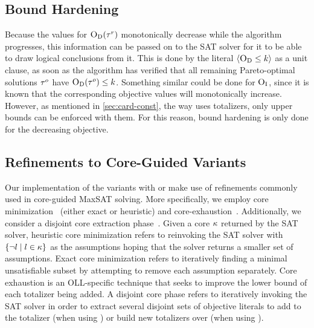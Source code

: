 \subsection{Bound Hardening}

Because the values for $\textsc{O}_{\text{D}}(\tau^r)$ monotonically decrease while the algorithm progresses, this information can be passed on to the SAT solver for it to be able to draw logical conclusions from it.
This is done by the literal $\langle \textsc{O}_{\text{D}} \leq k \rangle$ as a unit clause, as soon as the algorithm has verified that all remaining Pareto-optimal solutions $\tau^o$ have $\textsc{O}_{\text{D}}(\tau^o)\le k$.
Something similar could be done for $\textsc{O}_{\text{I}}$, since it is known that the corresponding objective values will monotonically increase.
However, as mentioned in \cref{sec:card-const}, the way \algname{} uses totalizers, only upper bounds can be enforced with them.
For this reason, bound hardening is only done for the decreasing objective.

\subsection{Refinements to Core-Guided Variants}

Our implementation of the variants \algname{} with \msu{} or \oll{} make use of refinements commonly used in core-guided MaxSAT solving.
More specifically, we employ core minimization~\autocite{DBLP:journals/jsat/IgnatievMM19} (either exact or heuristic) and core-exhaustion~\autocites{DBLP:journals/jsat/IgnatievMM19,DBLP:conf/cp/AnsoteguiBGL13}.
Additionally, we consider a disjoint core extraction phase~\autocite{DBLP:conf/cp/DaviesB11}.
Given a core $\kappa$ returned by the SAT solver, heuristic core minimization refers to reinvoking the SAT solver with $\{\lnot l \mid l \in \kappa\}$ as the assumptions hoping that the solver returns a smaller set of assumptions.
Exact core minimization refers to iteratively finding a minimal unsatisfiable subset by attempting to remove each assumption separately.
Core exhaustion is an OLL-specific technique that seeks to improve the lower bound of each totalizer being added.
A disjoint core phase refers to iteratively invoking the SAT solver in order to extract several disjoint sets of objective literals to add to the totalizer (when using \msu{}) or build new totalizers over (when using \oll{}).
